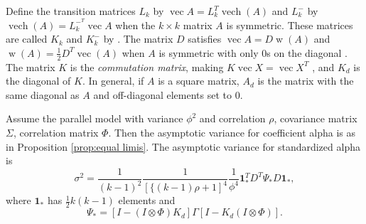 \documentclass[twoside]{article}
\DeclareMathOperator{\vvec}{vec}
\DeclareMathOperator{\vech}{vech}
\DeclareMathOperator{\w}{w}
\begin{document}
Define the transition matrices $L_{k}$ by $\vvec A=L_{k}^{T}\vech(A)$
and $L_{k}^{-}$ by $\vech(A)=L_{k}^{-^{T}}\vvec A$ when the $k\times k$
matrix $A$ is symmetric. These matrices
are called $K_{k}$ and $K_{k}^{-}$ by \citet{Van_Zyl2000-si}. The
matrix $D$ satisfies $\vvec A=D\w(A)$ and $\w(A)=\frac{1}{2}D^{T}\vvec(A)$
when $A$ is symmetric with only $0$s on the diagonal \citep{Neudecker1996-fu}.
The matrix $K$ is the \emph{commutation matrix}, making $K\vvec X=\vvec X^{T}$
\citep[see][Chapter 3.8]{Magnus2019-cz}, and $K_{d}$ is the diagonal
of $K$. In general, if $A$ is a square matrix, $A_{d}$ is the matrix
with the same diagonal as $A$ and off-diagonal elements set to $0$. 
\begin{lem}
\label{lem:variances}Assume the parallel model with variance $\phi^{2}$
and correlation $\rho$, covariance matrix $\Sigma$, correlation
matrix $\Phi$. Then the asymptotic variance for coefficient alpha is as in Proposition \ref{prop:equal limis}. The asymptotic variance for standardized alpha is 
\begin{equation}
\nonumber
\sigma^{2}=\frac{1}{(k-1)^{2}}\frac{1}{[\{(k-1)\rho+1]^{4}}\frac{1}{\phi^{4}}\boldsymbol{1}_{*}^{T}D^{T}\Psi_{*}D\boldsymbol{1}_{*},
\end{equation}
where $\boldsymbol{1}_{*}$ has $\frac{1}{2}k(k-1)$ elements and
\[
\Psi_{*}=[I-(I\otimes\Phi)K_{d}]\Gamma[I-K_{d}(I\otimes\Phi)].
\]
\end{lem}
\end{document}
